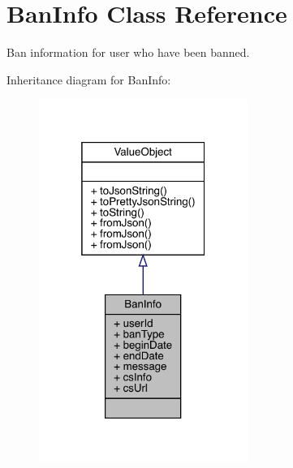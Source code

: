 \hypertarget{classcom_1_1toast_1_1android_1_1gamebase_1_1auth_1_1data_1_1_ban_info}{}\section{Ban\+Info Class Reference}
\label{classcom_1_1toast_1_1android_1_1gamebase_1_1auth_1_1data_1_1_ban_info}


Ban information for user who have been banned.  




Inheritance diagram for Ban\+Info\+:\nopagebreak
\begin{figure}[H]
\begin{center}
\leavevmode
\includegraphics[width=193pt]{classcom_1_1toast_1_1android_1_1gamebase_1_1auth_1_1data_1_1_ban_info__inherit__graph}
\end{center}
\end{figure}


